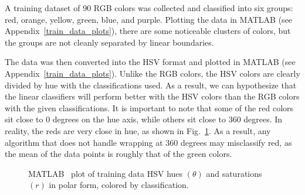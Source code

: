 \documentclass[twoside]{IEEEtran}
\begin{document}
A training dataset of 90 RGB colors was collected and classified into six groups: red, orange,
yellow, green, blue, and purple. Plotting the data in MATLAB (see Appendix~\ref{train_data_plots}), there are
some noticeable clusters of colors, but the groups are not cleanly separated by linear boundaries.

The data was then converted into the HSV format and plotted in MATLAB (see Appendix~\ref{train_data_plots}).
Unlike the RGB colors, the HSV colors are clearly divided by hue with the classifications
used. As a result, we can hypothesize that the linear classifiers will perform better with the HSV
colors than the RGB colors with the given classifications. It is important to note that some of the
red colors sit close to 0 degrees on the hue axis, while others sit close to 360 degrees. In reality,
the reds are very close in hue, as shown in Fig.~\ref{hsv_polar}. As a result, any algorithm that does not
handle wrapping at 360 degrees may misclassify red, as the mean of the data points is roughly
that of the green colors.

\begin{figure}[!t]
    \centering
    \hfil
    \caption{MATLAB~\cite{matlab} plot of training data HSV hues \( \left(\theta\right) \) and saturations \( \left(r\right) \) in polar form, colored by classification.}%
    \label{hsv_polar}
\end{figure}
\end{document}
